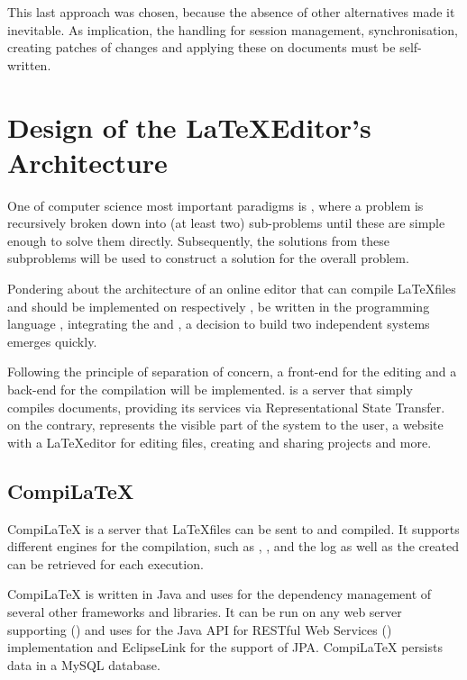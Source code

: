 This last approach was chosen, because the absence of other alternatives made it inevitable. As implication, the handling for session management, synchronisation, creating patches of changes and applying these on documents must be self-written.

\section{Design of the \LaTeX Editor's Architecture}
\label{sec:architecture}

One of computer science most important paradigms is , where a problem is recursively broken down into (at least two) sub-problems until these are simple enough to solve them directly. Subsequently, the solutions from these subproblems will be used to construct a solution for the overall problem.

Pondering about the architecture of an online editor that can compile \LaTeX files and should be implemented on  respectively , be written in the programming language , integrating the  and , a decision to build two independent systems emerges quickly.

Following the principle of separation of concern, a front-end for the editing and a back-end for the compilation will be implemented.  is a server that simply compiles documents, providing its services via Representational State Transfer.  on the contrary, represents the visible part of the system to the user, a website with a \LaTeX editor for editing files, creating and sharing projects and more. 

\subsection{CompiLaTeX}
\label{subsec:compilatex}
CompiLaTeX is a server that \LaTeX files can be sent to and compiled. It supports different engines for the compilation, such as , ,  and the log as well as the created  can be retrieved for each execution.

CompiLaTeX is written in Java and uses  for the dependency management of several other frameworks and libraries. It can be run on any web server supporting  () and uses  for the Java API for RESTful Web Services () implementation and EclipseLink for the support of JPA. CompiLaTeX persists data in a MySQL database.

